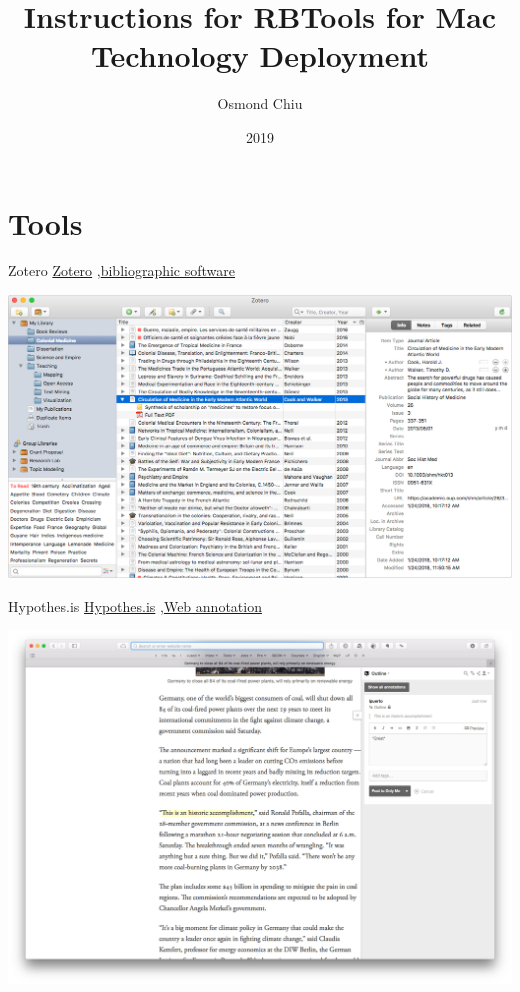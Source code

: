 \documentclass[10pt,a4paper]{article}
\title{Instructions for RBTools for Mac Technology Deployment}
\author{Osmond Chiu}
\date{2019}
\begin{document}
\small

\maketitle
\thispagestyle{empty}
\scriptsize
\tableofcontents





\section{Tools}


\begin{textbox}{Zotero}
 \href{https://zotero.org}{Zotero} \sep \href{https://zotero.org}{bibliographic software}

\includegraphics[width=\textwidth]{zotero.png}
\end{textbox}

\begin{textbox}{Hypothes.is}
 \href{https://hypothes.is/}{Hypothes.is} \sep \href{https://hypothes.is/}{Web annotation}

\includegraphics[width=\textwidth]{Hypothesis.png}

\end{textbox}
\end{document}
